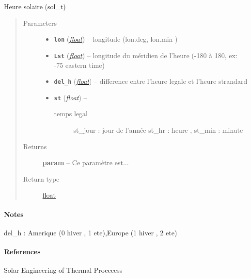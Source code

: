 \documentclass[letterpaper,10pt,english]{sphinxmanual}
\begin{document}
\begin{fulllineitems}
\label{python:solar_mod.heure_solaire}
Heure solaire (sol\_t)
\begin{quote}\begin{description}
\item[{Parameters}] \leavevmode\begin{itemize}
\item {} 
\textbf{\texttt{lon}} (\href{https://docs.python.org/library/functions.html\#float}{\emph{float}}) -- longitude (lon.deg, lon.min )

\item {} 
\textbf{\texttt{Lst}} (\href{https://docs.python.org/library/functions.html\#float}{\emph{float}}) -- longitude du méridien de l'heure (-180 à 180, ex: -75 eastern time)

\item {} 
\textbf{\texttt{del\_h}} (\href{https://docs.python.org/library/functions.html\#float}{\emph{float}}) -- difference entre l'heure legale et l'heure strandard

\item {} 
\textbf{\texttt{st}} (\href{https://docs.python.org/library/functions.html\#float}{\emph{float}}) -- \begin{description}
\item[{temps legal}] \leavevmode
st\_jour : jour de l'année
st\_hr : heure , st\_min : minute

\end{description}


\end{itemize}

\item[{Returns}] \leavevmode
\textbf{param} -- Ce paramètre est...

\item[{Return type}] \leavevmode
\href{https://docs.python.org/library/functions.html\#float}{float}

\end{description}\end{quote}
\paragraph{Notes}

del\_h : Amerique (0 hiver , 1 ete),Europe (1 hiver , 2 ete)
\paragraph{References}

Solar Engineering of Thermal Procecess

\end{fulllineitems}
\end{document}
